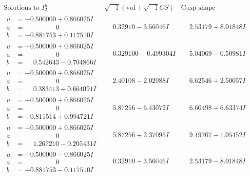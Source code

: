 \documentclass[1p]{elsarticle_modified}
\theoremstyle{definition}
\newcommand{\I}{\sqrt{-1}}
\begin{document}
$$\begin{array}{c|c|c}  
\text{Solutions to }I^u_{2}& \I (\text{vol} + \sqrt{-1}CS) & \text{Cusp shape}\\
 \hline 
\begin{aligned}
u &= -0.500000 + 0.866025 I \\
a &= \phantom{-0.000000 } 0 \\
b &= -0.881753 + 0.117510 I\end{aligned}
 & \phantom{-}0.32910 - 3.56046 I & \phantom{-}2.53179 + 8.01848 I \\ \hline\begin{aligned}
u &= -0.500000 + 0.866025 I \\
a &= \phantom{-0.000000 } 0 \\
b &= \phantom{-}0.542643 - 0.704866 I\end{aligned}
 & \phantom{-}0.329100 - 0.499304 I & \phantom{-}5.04069 - 0.50981 I \\ \hline\begin{aligned}
u &= -0.500000 + 0.866025 I \\
a &= \phantom{-0.000000 } 0 \\
b &= \phantom{-}0.383413 + 0.664091 I\end{aligned}
 & \phantom{-}2.40108 - 2.02988 I & \phantom{-}6.62546 + 2.50057 I \\ \hline\begin{aligned}
u &= -0.500000 + 0.866025 I \\
a &= \phantom{-0.000000 } 0 \\
b &= -0.811514 + 0.994721 I\end{aligned}
 & \phantom{-}5.87256 - 6.43072 I & \phantom{-}6.60498 + 6.63374 I \\ \hline\begin{aligned}
u &= -0.500000 + 0.866025 I \\
a &= \phantom{-0.000000 } 0 \\
b &= \phantom{-}1.267210 - 0.205431 I\end{aligned}
 & \phantom{-}5.87256 + 2.37095 I & \phantom{-}9.19707 - 1.05452 I \\ \hline\begin{aligned}
u &= -0.500000 - 0.866025 I \\
a &= \phantom{-0.000000 } 0 \\
b &= -0.881753 - 0.117510 I\end{aligned}
 & \phantom{-}0.32910 + 3.56046 I & \phantom{-}2.53179 - 8.01848 I \\ \hline\begin{aligned}

\end{aligned}
\end{array}$$
\end{document}
